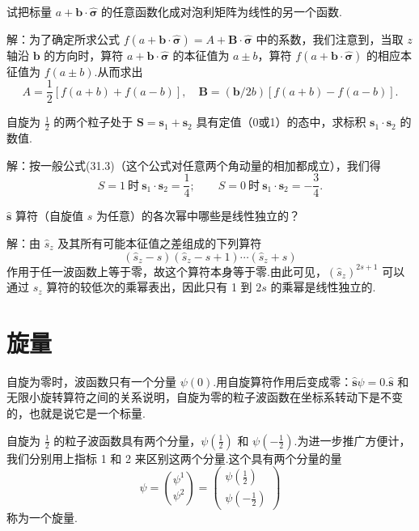 \begin{xiti}

\quad 试把标量 $a+\boldsymbol{b}\cdot\hat{\boldsymbol{\sigma}}$ 的任意函数化成对泡利矩阵为线性的另一个函数.

解：为了确定所求公式 $f(a+\boldsymbol{b}\cdot\hat{\boldsymbol{\sigma}})=A+\boldsymbol{B}\cdot\hat{\boldsymbol{\sigma}}$ 中的系数，我们注意到，当取 $z$ 轴沿 $\boldsymbol{b}$ 的方向时，算符 $a+\boldsymbol{b}\cdot\hat{\boldsymbol{\sigma}}$ 的本征值为 $a\pm b$，算符 $f(a+\boldsymbol{b}\cdot\hat{\boldsymbol{\sigma}})$ 的相应本征值为 $f(a\pm b)$.从而求出
\begin{equation*}
  A=\frac{1}{2}[f(a+b)+f(a-b)],\quad
  \boldsymbol{B}=(\boldsymbol{b}/2b)[f(a+b)-f(a-b)].
\end{equation*}

\quad 自旋为 $\frac{1}{2}$ 的两个粒子处于 $\boldsymbol{S}=\boldsymbol{s}_1+\boldsymbol{s}_2$ 具有定值（0或1）的态中，求标积 $\boldsymbol{s}_1\cdot\boldsymbol{s}_2$ 的数值.

解：按一般公式(31.3)（这个公式对任意两个角动量的相加都成立），我们得
\begin{equation*}
  S=1\ \text{时}\ \boldsymbol{s}_1\cdot\boldsymbol{s}_2=\frac{1}{4};\qquad
  S=0\ \text{时}\ \boldsymbol{s}_1\cdot\boldsymbol{s}_2=-\frac{3}{4}.
\end{equation*}

\quad $\hat{\boldsymbol{s}}$ 算符（自旋值 $s$ 为任意）的各次幂中哪些是线性独立的？

解：由 $\hat{s}_z$ 及其所有可能本征值之差组成的下列算符
\begin{equation*}
  (\hat{s}_z-s)(\hat{s}_z-s+1)\cdots(\hat{s}_z+s)
\end{equation*}
作用于任一波函数上等于零，故这个算符本身等于零.由此可见，$(\hat{s}_z)^{2s+1}$ 可以通过 $s_z$ 算符的较低次的乘幂表出，因此只有 1 到 $2s$ 的乘幂是线性独立的.

\end{xiti}

\section{旋量}

自旋为零时，波函数只有一个分量 $\psi(0)$.用自旋算符作用后变成零：$\hat{\boldsymbol{s}}\psi=0$.$\hat{\boldsymbol{s}}$ 和无限小旋转算符之间的关系说明，自旋为零的粒子波函数在坐标系转动下是不变的，也就是说它是一个标量.

自旋为 $\frac{1}{2}$ 的粒子波函数具有两个分量，$\psi\left(\frac{1}{2}\right)$ 和 $\psi\left(-\frac{1}{2}\right)$.为进一步推广方便计，我们分别用上指标 1 和 2 来区别这两个分量.这个具有两个分量的量
\begin{equation}
  \psi=\binom{\psi^1}{\psi^2}
  =\left(\begin{array}{c}
  \psi\left(\frac{1}{2}\right)\\[0.6em]
  \psi\left(-\frac{1}{2}\right)
  \end{array}\right)
\end{equation}
称为一个旋量.

